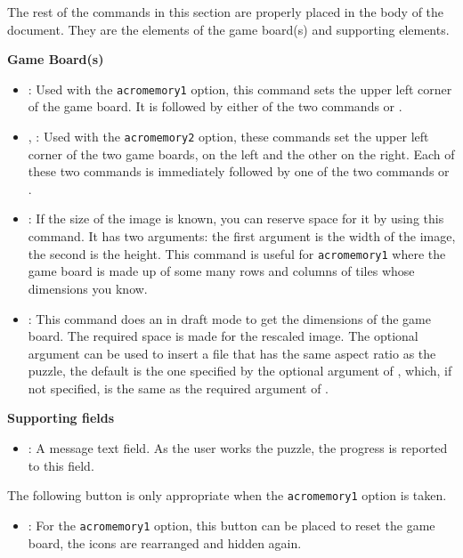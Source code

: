 \documentclass{article}
\begin{document}
\newtopic The rest of the commands in this section are properly
placed in the body of the document. They are the elements of the
game board(s) and supporting elements.

\newtopic\textbf{Game Board(s)}
\begin{itemize}
\item {}: Used with the \texttt{acromemory1} option,
this command sets the upper left corner of the game board. It is
followed by either of the two commands  or
.

\item {}, : Used with the
\texttt{acromemory2} option, these commands set the upper left
corner of the two game boards, on the left and the other on the
right. Each of these two commands is immediately followed by one of
the two commands  or
.

\item {}: If the size of the image is
known, you can reserve space for it by using this command. It has
two arguments: the first argument is the width of the image, the
second is the height. This command is useful for
\texttt{acromemory1} where the game board is made up of some many
rows and columns of tiles whose dimensions you know.

\item {}: This command does an
 in draft mode to get the dimensions of the game
board. The required space is made for the rescaled image. The
optional argument can be used to insert a file that has the same
aspect ratio as the puzzle, the default is the one specified by the
optional argument of , which, if not specified, is
the same as the required argument of .
\end{itemize}

\goodbreak
\newtopic\textbf{Supporting fields}
\begin{itemize}

\item {}: A message text field. As the user works the
puzzle, the progress is reported to this field.
\end{itemize}

\newtopic The following button is only appropriate when the \texttt{acromemory1}
option is taken.

\begin{itemize}
\item {}: For the \texttt{acromemory1} option, this
button can be placed to reset the game board, the icons are
rearranged and hidden again.
\end{itemize}
\end{document}
